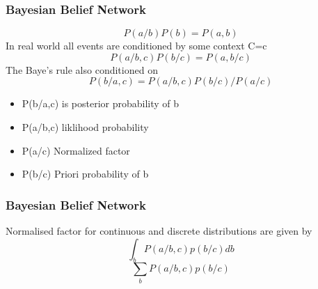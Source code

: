 \documentclass{beamer}
\begin{document}
\begin{frame}
\frametitle{\textbf{Bayesian Belief Network}}
\begin{equation}
    P(a/b)P(b)=P(a,b)
\end{equation}
In real world all events are conditioned by some context C=c
\begin{equation}
    P(a/b,c)P(b/c)=P(a,b/c)
\end{equation}
The Baye's rule also conditioned on
\begin{equation}
 P(b/a,c)={P(a/b,c)P(b/c)} / {P(a/c)}
\end{equation}
\begin{itemize}
  \item P(b/a,c) is posterior probability of b
  \item P(a/b,c) liklihood probability
  \item P(a/c) Normalized factor
  \item P(b/c) Priori probability of b
\end{itemize}
\end{frame}

\begin{frame}
\frametitle{\textbf{Bayesian Belief Network}}
Normalised factor  for continuous and discrete distributions are given by
\begin{equation}\label{}
    \int_{b} P(a/b,c)p(b/c)db
\end{equation}
\begin{equation}
    \sum_{b}P(a/b,c)p(b/c)
\end{equation}
\end{frame}
\end{document}
